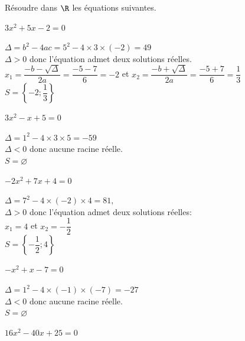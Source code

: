 \documentclass[12pt,a4paper]{article}  %
\begin{document}
Résoudre dans $\R$  les équations suivantes.
    \begin{enumMet}
        \item $3 x^{2}+5 x-2 = 0$\quad {}\\
        \begin{corrBox}
            $\Delta=b^2-4ac=5^{2}-4 \times 3 \times(-2)=49$ \\
            $\Delta>0$ donc l'équation admet deux solutions réelles.\\ 
            $x_{1}=\dfrac{-b-\sqrt{\Delta}}{2a}=\dfrac{-5-7}{6}=-2$ et $x_{2}=\dfrac{-b+\sqrt{\Delta}}{2a}=\dfrac{-5+7}{6}=\dfrac{1}{3}$ \\
            $S=\left\{-2;\dfrac{1}{3}\right\}$
        \end{corrBox}
        \item $3 x^{2}-x+5=0$\quad {}\\
        \begin{corrBox}
                $\Delta=1^{2}-4 \times 3 \times 5=-59$ \\
                $\Delta<0$ donc aucune racine réelle.\\
                $S=\varnothing$
        \end{corrBox}
        \item $-2 x^{2}+7 x+4=0$\quad {}\\
        \begin{corrBox}
            $\Delta=7^{2}-4 \times(-2) \times 4=81,$ \\
            $\Delta>0$ donc l'équation admet deux solutions réelles:\\
            $x_{1}=4$ et $x_{2}=-\dfrac{1}{2}$\\
            $S=\left\{-\dfrac{1}{2};4\right\}$
        \end{corrBox}
        \item $-x^{2}+x-7 = 0$\quad {}\\
        \begin{corrBox}
            $\Delta=1^{2}-4 \times (-1) \times(-7)=-27$\\
            $\Delta<0$ donc aucune racine réelle.\\
            $S=\varnothing$
        \end{corrBox}
        \item $16 x^{2}-40 x+25 = 0$\quad {}\\

\end{enumMet}
\end{document}
